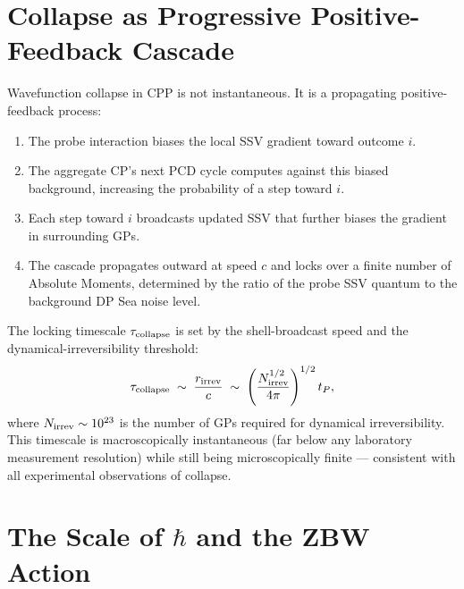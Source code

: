 \documentclass[12pt]{article}
\newcommand{\tP}{t_P}
\begin{document}
\section{Collapse as Progressive Positive-Feedback Cascade}
\label{sec:collapse}

Wavefunction collapse in CPP is not instantaneous.  It is a propagating
positive-feedback process:

\begin{enumerate}[noitemsep]
  \item The probe interaction biases the local SSV gradient toward outcome
    $i$.
  \item The aggregate CP's next PCD cycle computes against this biased
    background, increasing the probability of a step toward $i$.
  \item Each step toward $i$ broadcasts updated SSV that further biases the
    gradient in surrounding GPs.
  \item The cascade propagates outward at speed $c$ and locks over a finite
    number of Absolute Moments, determined by the ratio of the probe SSV
    quantum to the background DP Sea noise level.
\end{enumerate}

The locking timescale $\tau_{\rm collapse}$ is set by the shell-broadcast
speed and the dynamical-irreversibility threshold:
\begin{equation}
  \tau_{\rm collapse} \;\sim\; \frac{r_{\rm irrev}}{c}
  \;\sim\; \left(\frac{N_{\rm irrev}^{1/2}}{4\pi}\right)^{1/2} \tP,
  \label{eq:tau_collapse}
\end{equation}
where $N_{\rm irrev} \sim 10^{23}$ is the number of GPs required for
dynamical irreversibility.  This timescale is macroscopically instantaneous
(far below any laboratory measurement resolution) while still being
microscopically finite --- consistent with all experimental observations of
collapse.

\section{The Scale of \boldmath$\hbar$ and the ZBW Action}
\label{sec:hbar}
\end{document}
